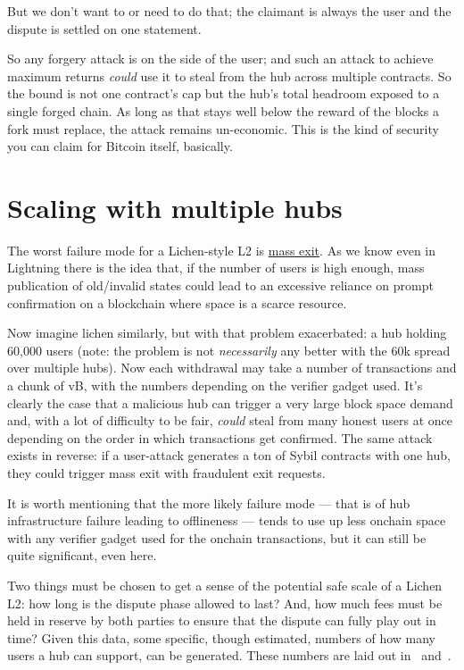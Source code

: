 \documentclass[11pt]{article}
\begin{document}
But we don't want to or need to do that; the claimant is always the user and the dispute is settled on one statement.

So any forgery attack is on the side of the user; and such an attack to achieve maximum returns \emph{could} use it to steal from the hub across multiple contracts.
So the bound is not one contract's cap but
the hub's total headroom exposed to a single forged chain. As long as
that stays well below the reward of the blocks a fork must replace, the attack remains un-economic. This is the kind of security you can claim for Bitcoin itself, basically.

\section{Scaling with multiple hubs}
\label{sec:multihub}

The worst failure mode for a Lichen-style L2 is \underline{mass exit}. As we know even in Lightning there is the idea that, if the number of users is high enough, mass publication of old/invalid states could lead to an excessive reliance on prompt confirmation on a blockchain where space is a scarce resource.

Now imagine lichen similarly, but with that problem exacerbated: a hub holding 60,000 users (note: the problem is not \emph{necessarily} any better with the 60k spread over multiple hubs). Now each withdrawal may take a number of transactions and a chunk of vB, with the numbers depending on the verifier gadget used. It's clearly the case that a malicious hub can trigger a very large block space demand and, with a lot of difficulty to be fair, \emph{could} steal from many honest users at once depending on the order in which transactions get confirmed. The same attack exists in reverse: if a user-attack generates a ton of Sybil contracts with one hub, they could trigger mass exit with fraudulent exit requests.

It is worth mentioning that the more likely failure mode --- that is of hub infrastructure failure leading to offlineness --- tends to use up less onchain space with any verifier gadget used for the onchain transactions, but it can still be quite significant, even here.

Two things must be chosen to get a sense of the potential safe scale of a Lichen L2: how long is the dispute phase allowed to last? And, how much fees must be held in reserve by both parties to ensure that the dispute can fully play out in time? Given this data, some specific, though estimated, numbers of how many users a hub can support, can be generated. These numbers are laid out in~\cite{lichenbitvmx} and~\cite{lichenbabe}.
\end{document}
